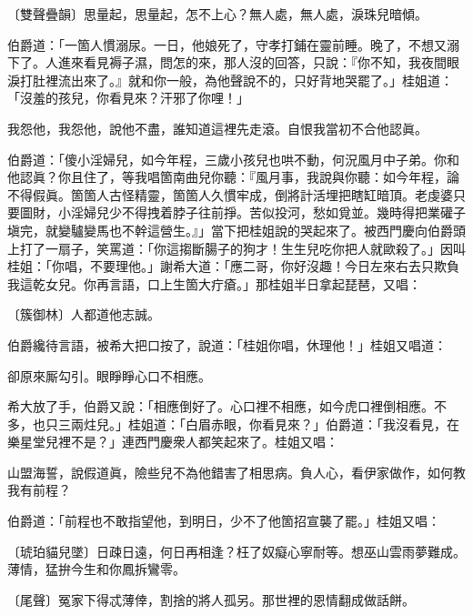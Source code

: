 \begin{myquote} 
{\markfont\small〔雙聲疊韻〕}思量起，思量起，怎不上心？無人處，無人處，淚珠兒暗傾。
\end{myquote} 

伯爵道：「一箇人慣溺尿。一日，他娘死了，守孝打鋪在靈前睡。晚了，不想又溺下了。人進來看見褥子濕，問怎的來，那人沒的回答，只說：『你不知，我夜間眼淚打肚裡流出來了。』就和你一般，為他聲說不的，只好背地哭罷了。」桂姐道：「沒羞的孩兒，你看見來？汗邪了你哩！」

\begin{myquote}
我怨他，我怨他，說他不盡，誰知道這裡先走滾。自恨我當初不合他認眞。
\end{myquote}

伯爵道：「傻小淫婦兒，如今年程，三歲小孩兒也哄不動，何況風月中子弟。你和他認眞？你且住了，等我唱箇南曲兒你聽：『風月事，我說與你聽：如今年程，論不得假眞。箇箇人古怪精靈，箇箇人久慣牢成，倒將計活埋把瞎缸暗頂。老虔婆只要圖財，小淫婦兒少不得拽着脖子往前掙。苦似投河，愁如覓並。幾時得把業礶子塡完，就變驢變馬也不幹這營生。』」當下把桂姐說的哭起來了。{}被西門慶向伯爵頭上打了一扇子，笑罵道：「你這搊斷腸子的狗才！生生兒吃你把人就歐殺了。」因叫桂姐：「你唱，不要理他。」謝希大道：「應二哥，你好沒趣！今日左來右去只欺負我這乾女兒。你再言語，口上生箇大疔瘡。」那桂姐半日拿起琵琶，又唱：

\begin{myquote}
{\markfont\small〔簇御林〕}人都道他志誠。
\end{myquote}

伯爵纔待言語，被希大把口按了，{}說道：「桂姐你唱，休理他！」桂姐又唱道：

\begin{myquote}
卻原來厮勾引。眼睜睜心口不相應。
\end{myquote}

希大放了手，伯爵又說：「相應倒好了。心口裡不相應，如今虎口裡倒相應。不多，也只三兩炷兒。」桂姐道：「白眉赤眼，你看見來？」伯爵道：「我沒看見，在樂星堂兒裡不是？」連西門慶衆人都笑起來了。桂姐又唱：

\begin{myquote}
山盟海誓，說假道眞，險些兒不為他錯害了相思病。負人心，看伊家做作，如何教我有前程？
\end{myquote}

伯爵道：「前程也不敢指望他，到明日，少不了他箇招宣襲了罷。」桂姐又唱：

\begin{myquote}
{\markfont\small〔琥珀貓兒墜〕}日疎日遠，何日再相逢？枉了奴癡心寧耐等。想巫山雲雨夢難成。薄情，猛拚今生和你鳳拆鸞零。

{\markfont\small〔尾聲〕}冤家下得忒薄倖，割捨的將人孤另。那世裡的恩情翻成做話餅。
\end{myquote}

